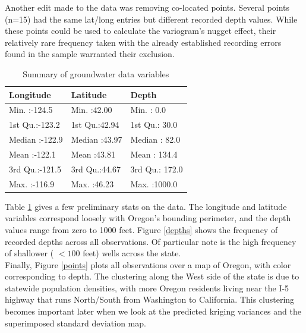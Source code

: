 \documentclass[12pt,twoside]{reedthesis}
\begin{document}
Another edit made to the data was removing co-located points. Several points (n=15) had the same lat/long entries but different recorded depth values. While these points could be used to calculate the variogram's nugget effect, their relatively rare frequency taken with the already established recording errors found in the sample warranted their exclusion. 

\begin{table}[h]

	\centering
	

 \begin{tabular}{l|l|l}

\hline
 Longitude &       Latitude &     Depth\\
\hline
 Min.   :-124.5   & Min.   :42.00   & Min.   :   0.0  \\
\hline
 1st Qu.:-123.2   & 1st Qu.:42.94   & 1st Qu.:  30.0  \\
\hline
 Median :-122.9   & Median :43.97   & Median :  82.0  \\
\hline
 Mean   :-122.1   & Mean   :43.81   & Mean   : 134.4  \\
\hline
 3rd Qu.:-121.5   & 3rd Qu.:44.67   & 3rd Qu.: 172.0  \\
\hline
 Max.   :-116.9   & Max.   :46.23   & Max.   :1000.0  \\
\hline



\end{tabular}
\label{data}
\caption{Summary of groundwater data variables}

\end{table}

Table \ref{data} gives a few preliminary stats on the data. The longitude and latitude variables correspond loosely with Oregon's bounding perimeter, and the depth values range from zero to 1000 feet. Figure \ref{depths} shows the frequency of recorded depths across all observations. Of particular note is the high frequency of shallower ( $<100$ feet) wells across the state. \\

Finally, Figure \ref{points} plots all observations over a map of Oregon, with color corresponding to depth. The clustering along the West side of the state is due to statewide population densities, with more Oregon residents living near the I-5 highway that runs North/South from Washington to California. This clustering becomes important later when we look at the predicted kriging variances and the superimposed standard deviation map.
\end{document}
